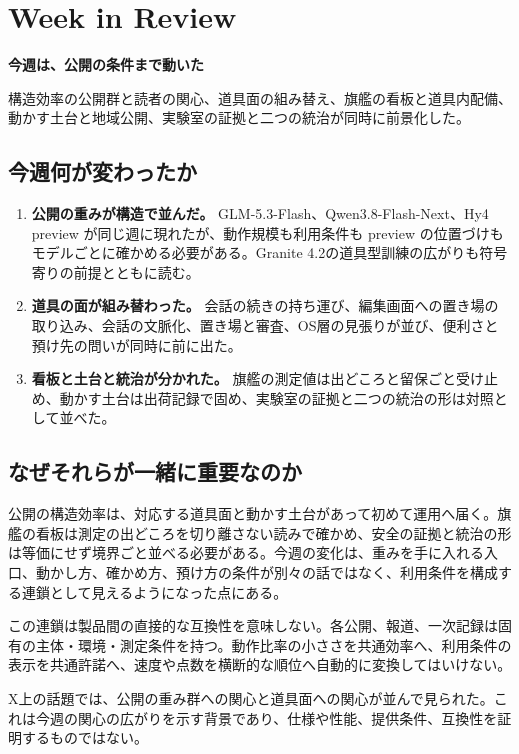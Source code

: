 \section{Week in Review}
\begin{wideflow}
{\Large\bfseries 今週は、公開の条件まで動いた}\par
\smallskip
{\color{SurveyMuted}構造効率の公開群と読者の関心、道具面の組み替え、旗艦の看板と道具内配備、動かす土台と地域公開、実験室の証拠と二つの統治が同時に前景化した。}\par
\end{wideflow}

\subsection*{今週何が変わったか}
\begin{enumerate}[leftmargin=1.6em]
\item \textbf{公開の重みが構造で並んだ。} GLM-5.3-Flash、Qwen3.8-Flash-Next、Hy4 preview が同じ週に現れたが、動作規模も利用条件も preview の位置づけもモデルごとに確かめる必要がある。Granite 4.2の道具型訓練の広がりも符号寄りの前提とともに読む。
\item \textbf{道具の面が組み替わった。} 会話の続きの持ち運び、編集画面への置き場の取り込み、会話の文脈化、置き場と審査、OS層の見張りが並び、便利さと預け先の問いが同時に前に出た。
\item \textbf{看板と土台と統治が分かれた。} 旗艦の測定値は出どころと留保ごと受け止め、動かす土台は出荷記録で固め、実験室の証拠と二つの統治の形は対照として並べた。
\end{enumerate}

\subsection*{なぜそれらが一緒に重要なのか}
公開の構造効率は、対応する道具面と動かす土台があって初めて運用へ届く。旗艦の看板は測定の出どころを切り離さない読みで確かめ、安全の証拠と統治の形は等価にせず境界ごと並べる必要がある。今週の変化は、重みを手に入れる入口、動かし方、確かめ方、預け方の条件が別々の話ではなく、利用条件を構成する連鎖として見えるようになった点にある。

この連鎖は製品間の直接的な互換性を意味しない。各公開、報道、一次記録は固有の主体・環境・測定条件を持つ。動作比率の小ささを共通効率へ、利用条件の表示を共通許諾へ、速度や点数を横断的な順位へ自動的に変換してはいけない。

\begin{communitynote}
X上の話題では、公開の重み群への関心と道具面への関心が並んで見られた。これは今週の関心の広がりを示す背景であり、仕様や性能、提供条件、互換性を証明するものではない\cite{w35community}。
\end{communitynote}

